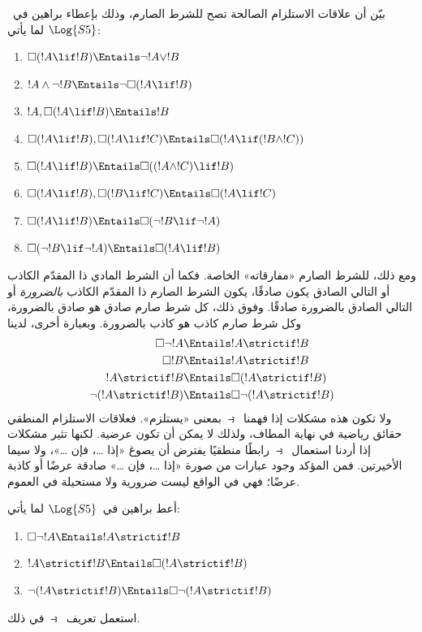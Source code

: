 \documentclass[../../../include/open-logic-section]{subfiles}
\begin{document}
\begin{prob}
  بيّن أن علاقات الاستلزام الصالحة تصح للشرط الصارم، وذلك بإعطاء
  براهين في~$\Log{S5}$ لما يأتي:
  \begin{enumerate}
  \item  $\Box(!A \lif !B) \Entails \lnot !A \lor !B$
  \item $!A \land \lnot !B \Entails \lnot\Box(!A \lif !B)$
  \item $!A, \Box(!A \lif !B) \Entails !B$
  \item $\Box(!A \lif !B), \Box(!A \lif !C) \Entails \Box(!A \lif (!B
    \land !C))$
  \item $\Box(!A \lif !B) \Entails \Box((!A \land !C) \lif !B)$
  \item $\Box(!A \lif !B), \Box(!B \lif !C) \Entails \Box(!A
    \lif !C)$
  \item $\Box(!A \lif !B) \Entails \Box(\lnot !B \lif \lnot !A)$
  \item $\Box(\lnot !B \lif \lnot !A) \Entails \Box(!A \lif !B)$
  \end{enumerate}
  \end{prob}

ومع ذلك، للشرط الصارم «مفارقاته» الخاصة. فكما أن الشرط المادي ذا
المقدّم الكاذب أو التالي الصادق يكون صادقًا، يكون الشرط الصارم ذا
المقدّم الكاذب \emph{بالضرورة} أو التالي الصادق بالضرورة صادقًا.
وفوق ذلك، كل شرط صارم صادق هو صادق بالضرورة، وكل شرط صارم كاذب هو كاذب
بالضرورة. وبعبارة أخرى، لدينا
\begin{align}
  \Box \lnot !A & \Entails !A \strictif !B\\
  \Box !B & \Entails !A \strictif !B\\
  !A \strictif !B& \Entails \Box(!A \strictif !B)\\
  \lnot(!A \strictif !B) & \Entails \Box\lnot(!A \strictif !B)
\end{align}
ولا تكون هذه مشكلات إذا فهمنا~$\strictif$ بمعنى «يستلزم». فعلاقات
الاستلزام المنطقي حقائق رياضية في نهاية المطاف، ولذلك لا يمكن أن تكون
عرضية. لكنها تثير مشكلات إذا أردنا استعمال~$\strictif$ رابطًا منطقيًا
يفترض أن يصوغ «إذا \dots، فإن \dots»، ولا سيما الأخيرتين. فمن المؤكد
وجود عبارات من صورة «إذا \dots، فإن \dots» صادقة عرضًا أو كاذبة عرضًا؛
فهي في الواقع ليست ضرورية ولا مستحيلة في العموم.

\begin{prob}
  أعط براهين في~$\Log{S5}$ لما يأتي:
  \begin{enumerate}
    \item  $\Box \lnot !A \Entails !A \strictif !B$
    \item $!A \strictif !B \Entails \Box(!A \strictif !B)$
    \item $\lnot(!A \strictif !B)  \Entails \Box\lnot(!A \strictif !B)$
  \end{enumerate}
  استعمل تعريف~$\strictif$ في ذلك.
\end{prob}
\end{document}
